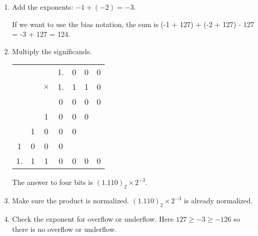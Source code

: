 







\begin{frame}[fragile]

\begin{columns}
    {\footnotesize
    \begin{enumerate}
\item Add the exponents: $-1+(-2)=-3$. 

If we want to use the bias notation, the sum is 
(-1 + 127) + (-2 + 127) - 127 = -3 + 127 = 124.

\item Multiply the significands.
{\tiny
\begin{center}
\begin{tabular}{ccccccc}
&&          &1. & 0 & 0 & 0  \\
&&$\times$  &1. & 1 & 1 & 0  \\ \hline
   &   &   &0  & 0 & 0 & 0  \\
   &   & 1 &0  & 0 & 0 &   \\
   & 1 & 0 & 0 & 0 &   & \\
 1 & 0 & 0 & 0 &   &   &\\ \hline
 1. & 1 & 1 & 0 & 0 & 0 & 0
\end{tabular}
\end{center}}

The answer to four bits is $(1.110)_2 \times 2^{-3}$.
\item Make sure the product is normalized. $(1.110)_2 \times 2^{-3}$ is already normalized.

\item Check the exponent for overflow or underflow. Here $127\geq -3 \geq -126$ so there is no overflow or underflow.


\end{enumerate}}
\end{columns}
\end{frame}
